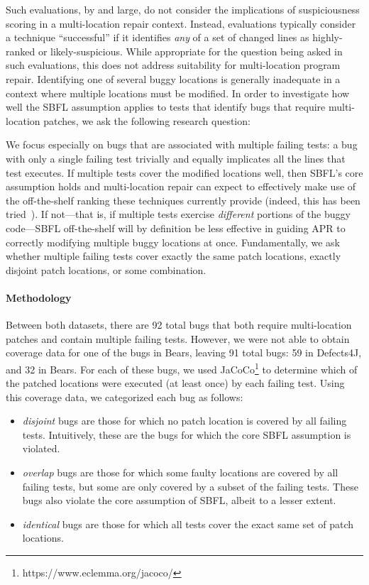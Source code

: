 Such evaluations, by and large, do not consider the implications of
suspiciousness scoring in a multi-location repair context.  Instead, evaluations
typically consider a technique ``successful'' if it identifies \emph{any} of a
set of changed lines as highly-ranked or likely-suspicious.  While appropriate
for the question being asked in such evaluations, this does not address
suitability for multi-location program repair.  Identifying one of several buggy
locations is generally inadequate in a context where multiple locations must be
modified. In order to investigate how well the SBFL assumption
applies to tests that identify bugs that require multi-location patches, we ask 
the following research question:



We focus especially on bugs that are associated with multiple failing tests: a bug
with only a single failing test trivially and equally implicates all the lines
that test executes.  If multiple tests cover the modified locations well, then
SBFL's core assumption holds and multi-location repair can expect to effectively
make use of the off-the-shelf ranking these techniques currently provide
(indeed, this has been tried~\cite{angelix}). If not---that is, if multiple
tests exercise \emph{different} portions of the buggy code---SBFL off-the-shelf
will by definition be less effective in guiding APR to correctly modifying
multiple buggy locations at once.
Fundamentally, we ask whether multiple failing tests cover exactly the same
patch locations, exactly disjoint patch locations, or some combination.

\paragraph{Methodology}

Between both datasets, there are 92 total bugs that both require multi-location
patches and contain multiple failing tests. However, we were not able to obtain coverage 
data for one of the bugs in Bears, leaving 91 total bugs: 59 in Defects4J, and 32 in
Bears. 
For each of these bugs, we used JaCoCo\footnote{https://www.eclemma.org/jacoco/}
to determine which of the patched locations were executed (at least once) by
each failing test. Using this coverage data, we categorized each bug as follows:
\begin{itemize}
\item \emph{disjoint} bugs are those for which no patch location is covered by all
failing tests.  Intuitively, these are the bugs for which the core SBFL
assumption is violated.
\item \emph{overlap} bugs are those for which some faulty locations are covered
by all failing tests, but some are only covered by a subset of the failing
tests. These bugs also violate the core assumption of SBFL, albeit to a lesser
extent.
\item \emph{identical} bugs are those for which all tests cover the exact same
  set of patch locations.
\end{itemize}


